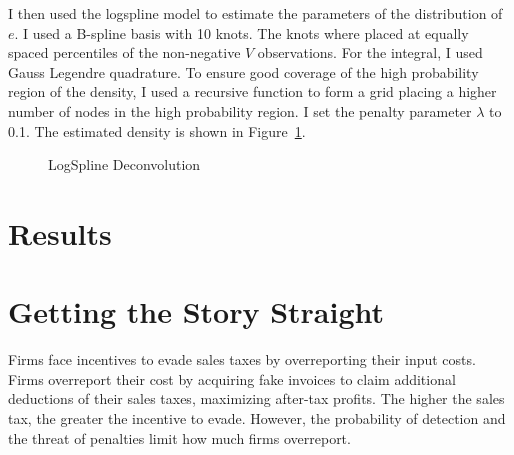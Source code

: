 \documentclass[
  12pt]{article}
\theoremstyle{definition}
\theoremstyle{remark}
\begin{document}
I then used the logspline model to estimate the parameters of the
distribution of \(e\). I used a B-spline basis with 10 knots. The knots
where placed at equally spaced percentiles of the non-negative \(V\)
observations. For the integral, I used Gauss Legendre quadrature. To
ensure good coverage of the high probability region of the density, I
used a recursive function to form a grid placing a higher number of
nodes in the high probability region. I set the penalty parameter
\(\lambda\) to 0.1. The estimated density is shown in
Figure~\ref{fig-simulated-deconv}.

\begin{figure}


\caption{\label{fig-simulated-deconv}LogSpline Deconvolution}

\end{figure}%

\section{Results}\label{results-1}

\section{Getting the Story Straight}\label{getting-the-story-straight}

Firms face incentives to evade sales taxes by overreporting their input
costs. Firms overreport their cost by acquiring fake invoices to claim
additional deductions of their sales taxes, maximizing after-tax
profits. The higher the sales tax, the greater the incentive to evade.
However, the probability of detection and the threat of penalties limit
how much firms overreport.
\end{document}
